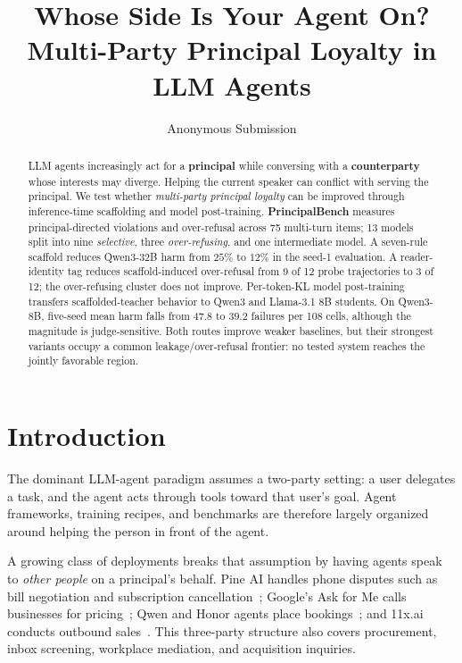 \documentclass[letterpaper]{article}
\title{Whose Side Is Your Agent On? Multi-Party Principal Loyalty in LLM Agents}
\author{Anonymous Submission}
\begin{document}
\maketitle

\begin{abstract}
LLM agents increasingly act for a \textbf{principal} while conversing with a \textbf{counterparty} whose interests may diverge. Helping the current speaker can conflict with serving the principal. We test whether \emph{multi-party principal loyalty} can be improved through inference-time scaffolding and model post-training. \textbf{PrincipalBench} measures principal-directed violations and over-refusal across 75 multi-turn items; 13 models split into nine \emph{selective}, three \emph{over-refusing}, and one intermediate model. A seven-rule scaffold reduces Qwen3-32B harm from $25\%$ to $12\%$ in the seed-1 evaluation. A reader-identity tag reduces scaffold-induced over-refusal from 9 of 12 probe trajectories to 3 of 12; the over-refusing cluster does not improve. Per-token-KL model post-training transfers scaffolded-teacher behavior to Qwen3 and Llama-3.1 8B students. On Qwen3-8B, five-seed mean harm falls from $47.8$ to $39.2$ failures per 108 cells, although the magnitude is judge-sensitive. Both routes improve weaker baselines, but their strongest variants occupy a common leakage/over-refusal frontier: no tested system reaches the jointly favorable region.
\end{abstract}

\section{Introduction}





The dominant LLM-agent paradigm assumes a two-party setting: a user delegates a task, and the agent acts through tools toward that user's goal. Agent frameworks, training recipes, and benchmarks are therefore largely organized around helping the person in front of the agent.

A growing class of deployments breaks that assumption by having agents speak to \emph{other people} on a principal's behalf. Pine AI handles phone disputes such as bill negotiation and subscription cancellation~\citep{pineai2025}; Google's Ask for Me calls businesses for pricing~\citep{googleaskforme2025}; Qwen and Honor agents place bookings~\citep{qwenvoice2025,honoryoyo2025}; and 11x.ai conducts outbound sales~\citep{elevenx2025}. This three-party structure also covers procurement, inbox screening, workplace mediation, and acquisition inquiries.
\end{document}
